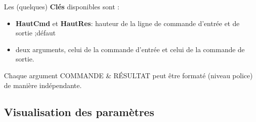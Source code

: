 \documentclass[a4paper,french,11pt]{article}
\newcommand\Cle[1]{{\bfseries\sffamily\textlangle #1\textrangle}}
\begin{document}
\begin{codetex}
\end{codetex}

\begin{codecles}
Les (quelques) \Cle{Clés} disponibles sont :

\begin{itemize}
	\item \Cle{HautCmd} et \Cle{HautRes}: hauteur de la ligne de commande d'entrée et de sortie ;\hfill{}défaut \Cle{0.75}
	\item deux \textsf{arguments}, celui de la commande d'entrée et celui de la commande de sortie.
\end{itemize}
%
Chaque argument \textsf{COMMANDE} \& \textsf{RÉSULTAT} peut être formaté (niveau police) de manière indépendante.
\end{codecles}

\begin{codetex}
\CalculFormelParametres[Titre=true,CouleurCmd=olive,CouleurRes=orange]
\end{codetex}

\subsection{Visualisation des paramètres}
\end{document}
